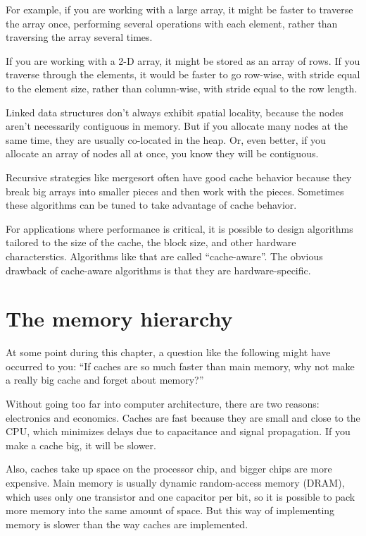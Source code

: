 \documentclass[12pt]{book}
\begin{document}
For example, if you are working with a large array, it might be
faster to traverse the array once, performing several operations with
each element, rather than traversing the array several times.

If you are working with a 2-D array, it might be stored as an array
of rows.  If you traverse through the elements, it would be faster
to go row-wise, with stride equal to the element size, rather
than column-wise, with stride equal to the row length.

Linked data structures don't always exhibit spatial locality, because
the nodes aren't necessarily contiguous in memory.  But if you allocate
many nodes at the same time, they are usually co-located in the heap.
Or, even better, if you allocate an array of nodes all at once, you
know they will be contiguous.

Recursive strategies like mergesort often have good cache behavior
because they break big arrays into smaller pieces and then work
with the pieces.  Sometimes these algorithms can be tuned to take
advantage of cache behavior.

For applications where performance is critical, it is possible
to design algorithms tailored to the size of the cache, the block size,
and other hardware characterstics.  Algorithms like that are
called ``cache-aware''.  The obvious drawback of cache-aware
algorithms is that they are hardware-specific.


\section{The memory hierarchy}

At some point during this chapter, a question like the following
might have occurred to you: ``If caches are so much faster than
main memory, why not make a really big cache and forget about
memory?''

Without going too far into computer architecture, there are two
reasons: electronics and economics.  Caches are fast because they are
small and close to the CPU, which minimizes delays due to capacitance
and signal propagation.  If you make a cache big, it will be slower.

Also, caches take up space on the processor chip, and bigger chips are
more expensive.  Main memory is usually dynamic random-access memory
(DRAM), which uses only one transistor and one capacitor per bit, so
it is possible to pack more memory into the same amount of space.  But
this way of implementing memory is slower than the way caches are
implemented.
 
\end{document}
